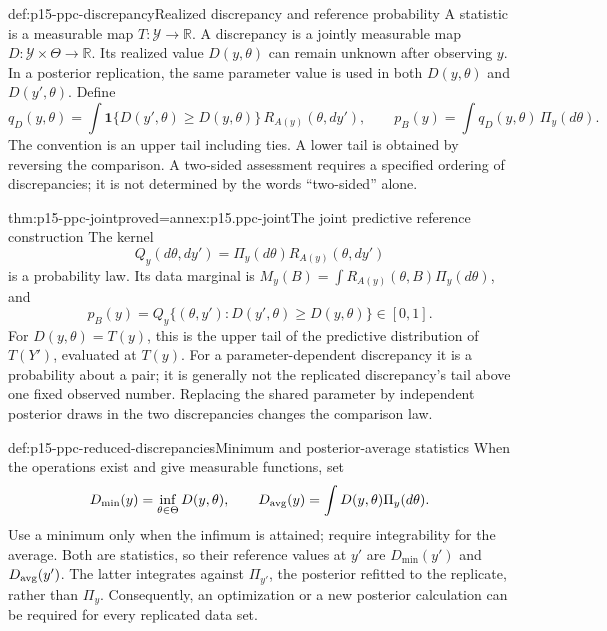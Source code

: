 \begin{hbdefinition}{def:p15-ppc-discrepancy}{Realized discrepancy and reference probability}
A statistic is a measurable map \(T:\mathcal Y\to\mathbb R\).
A discrepancy is a jointly measurable map
\(D:\mathcal Y\times\Theta\to\mathbb R\). Its realized value
\(D(y,\theta)\) can remain unknown after observing \(y\).
In a posterior replication, the same parameter value is used in both
\(D(y,\theta)\) and \(D(y',\theta)\). Define
\[
 q_D(y,\theta)=\int
  \mathbf1\{D(y',\theta)\geq D(y,\theta)\}\,R_{A(y)}(\theta,dy'),
 \qquad p_B(y)=\int q_D(y,\theta)\,\Pi_y(d\theta).
\]
The convention is an upper tail including ties. A lower tail is obtained by
reversing the comparison. A two-sided assessment requires a specified ordering
of discrepancies; it is not determined by the words ``two-sided'' alone.
\end{hbdefinition}

\begin{hbtheorem}{thm:p15-ppc-joint}{proved=annex:p15.ppc-joint}{The joint predictive reference construction}
The kernel
\[
 Q_y(d\theta,dy')=\Pi_y(d\theta)R_{A(y)}(\theta,dy')
\]
is a probability law. Its data marginal is
\(M_y(B)=\int R_{A(y)}(\theta,B)\Pi_y(d\theta)\), and
\[
 p_B(y)=Q_y\{(\theta,y'):D(y',\theta)\geq D(y,\theta)\}\in[0,1].
\]
For \(D(y,\theta)=T(y)\), this is the upper tail of the predictive
distribution of \(T(Y')\), evaluated at \(T(y)\).
For a parameter-dependent discrepancy it is a probability about a pair;
it is generally not the replicated discrepancy's tail above one fixed observed
number. Replacing the shared parameter by independent posterior draws
in the two discrepancies changes the comparison law.
\end{hbtheorem}

\begin{hbdefinition}{def:p15-ppc-reduced-discrepancies}{Minimum and posterior-average statistics}
When the operations exist and give measurable functions, set
\[
 D_{\min}(y)=\inf_{\theta\in\Theta}D(y,\theta),\qquad
 D_{\rm avg}(y)=\int D(y,\theta)\Pi_y(d\theta).
\]
Use a minimum only when the infimum is attained; require integrability for
the average. Both are statistics, so their reference values at \(y'\)
are \(D_{\min}(y')\) and \(D_{\rm avg}(y')\).
The latter integrates against \(\Pi_{y'}\), the posterior refitted to
the replicate, rather than \(\Pi_y\). Consequently, an optimization or a
new posterior calculation can be required for every replicated data set.
\end{hbdefinition}

